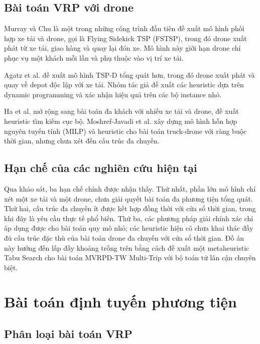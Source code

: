 \documentclass[../DoAn.tex]{subfiles}
\begin{document}
\subsection{Bài toán VRP với drone}

Murray và Chu là một trong những công trình đầu tiên đề xuất mô hình phối hợp xe tải và drone, gọi là Flying Sidekick TSP (FSTSP), trong đó drone xuất phát từ xe tải, giao hàng và quay lại đón xe. Mô hình này giới hạn drone chỉ phục vụ một khách mỗi lần và phụ thuộc vào vị trí xe tải.

Agatz et al. đề xuất mô hình TSP-D tổng quát hơn, trong đó drone xuất phát và quay về depot độc lập với xe tải. Nhóm tác giả đề xuất các heuristic dựa trên dynamic programming và xác nhận hiệu quả trên các bộ instance nhỏ.

Ha et al. mở rộng sang bài toán đa khách với nhiều xe tải và drone, đề xuất heuristic tìm kiếm cục bộ. Moshref-Javadi et al. xây dựng mô hình hỗn hợp nguyên tuyến tính (MILP) và heuristic cho bài toán truck-drone với ràng buộc thời gian, nhưng chưa xét đến cấu trúc đa chuyến.

\subsection{Hạn chế của các nghiên cứu hiện tại}

Qua khảo sát, ba hạn chế chính được nhận thấy. Thứ nhất, phần lớn mô hình chỉ xét một xe tải và một drone, chưa giải quyết bài toán đa phương tiện tổng quát. Thứ hai, cấu trúc đa chuyến ít được kết hợp đồng thời với cửa sổ thời gian, trong khi đây là yêu cầu thực tế phổ biến. Thứ ba, các phương pháp giải chính xác chỉ áp dụng được cho bài toán quy mô nhỏ; các heuristic hiện có chưa khai thác đầy đủ cấu trúc đặc thù của bài toán drone đa chuyến với cửa sổ thời gian. Đồ án này hướng đến lấp đầy khoảng trống trên bằng cách đề xuất một metaheuristic Tabu Search cho bài toán MVRPD-TW Multi-Trip với bộ toán tử lân cận chuyên biệt.

\section{Bài toán định tuyến phương tiện}
\label{sec:vrp}

\subsection{Phân loại bài toán VRP}
\end{document}
